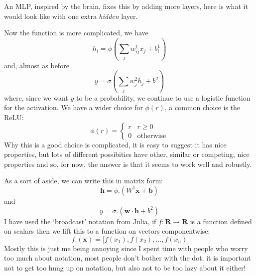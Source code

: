 \documentclass[12pt]{article}
\begin{document}
An MLP, inspired by the brain, fixes this by adding more layers, here
is what it would look like with one extra \textsl{hidden} layer.
\begin{center}
\end{center}
Now the function is more complicated, we have
\begin{equation}
  h_i=\phi(\sum_j w^1_{ij}x_j+b^1_i)
\end{equation}
and, almost as before
\begin{equation}
  y=\sigma(\sum_j w^2_j h_j+b^2)
\end{equation}
where, since we want $y$ to be a probability, we continue to use a logistic function for the activation. We have a wider choice for $\phi(r)$, a common choice is the ReLU:
\begin{equation}
  \phi(r)=\left\{\begin{array}{ll}r&r\ge 0\\0&\text{otherwise}\end{array}\right.
\end{equation}
Why this is a good choice is complicated, it is easy to suggest it has
nice properties, but lots of different possibities have other, similar
or competing, nice properties and so, for now, the answer is that it
seems to work well and robustly.

As a sort of aside, we can write this in matrix form:
\begin{equation}
  \mathbf{h}=\phi.(W^1 \mathbf{x}+\mathbf{b})
\end{equation}
and 
\begin{equation}
  y=\sigma.(\mathbf{w}\cdot\mathbf{h}+b^2)
\end{equation}
I have used the `broadcast' notation from Julia, if $f:\textbf{R}\rightarrow\textbf{R}$ is a function defined on scalars then we lift this to a function on vectors componentwise:
\begin{equation}
  f.(\textbf{x})=[f(x_1),f(x_2),\ldots,f(x_n)
\end{equation}
Mostly this is just me being annoying since I spent time with people who worry too much about notation, most people don't bother with the dot; it is important not to get too hung up on notation, but also not to be too lazy about it either!
\end{document}
